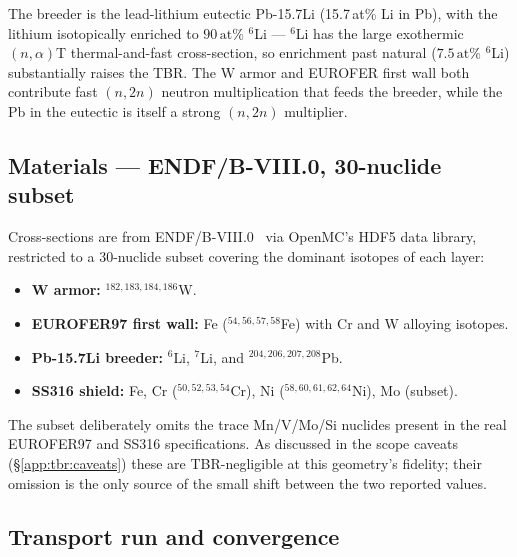 The breeder is the lead-lithium eutectic Pb-15.7Li (15.7\,at\% Li in Pb),
with the lithium isotopically enriched to $90\,\text{at\%}$ $^6$Li --- $^6$Li
has the large exothermic $(n,\alpha)$T thermal-and-fast cross-section, so
enrichment past natural ($7.5\,\text{at\%}$ $^6$Li) substantially raises the
TBR. The W armor and EUROFER first wall both contribute fast $(n,2n)$ neutron
multiplication that feeds the breeder, while the Pb in the eutectic is itself a
strong $(n,2n)$ multiplier.

\subsection{Materials --- ENDF/B-VIII.0, 30-nuclide subset}
\label{app:tbr:mat}

Cross-sections are from ENDF/B-VIII.0~\citep{brown2018endf} via OpenMC's HDF5
data library, restricted to a 30-nuclide subset covering the dominant
isotopes of each layer:
\begin{itemize}\itemsep0.15em
\item \textbf{W armor:} $^{182,183,184,186}$W.
\item \textbf{EUROFER97 first wall:} Fe ($^{54,56,57,58}$Fe) with Cr and W
  alloying isotopes.
\item \textbf{Pb-15.7Li breeder:} $^{6}$Li, $^{7}$Li, and
  $^{204,206,207,208}$Pb.
\item \textbf{SS316 shield:} Fe, Cr ($^{50,52,53,54}$Cr), Ni
  ($^{58,60,61,62,64}$Ni), Mo (subset).
\end{itemize}
The subset deliberately omits the trace Mn/V/Mo/Si nuclides present in the
real EUROFER97 and SS316 specifications. As discussed in the scope caveats
(\S\ref{app:tbr:caveats}) these are TBR-negligible at this geometry's
fidelity; their omission is the only source of the small shift between the two
reported values.

\subsection{Transport run and convergence}
\label{app:tbr:run}

